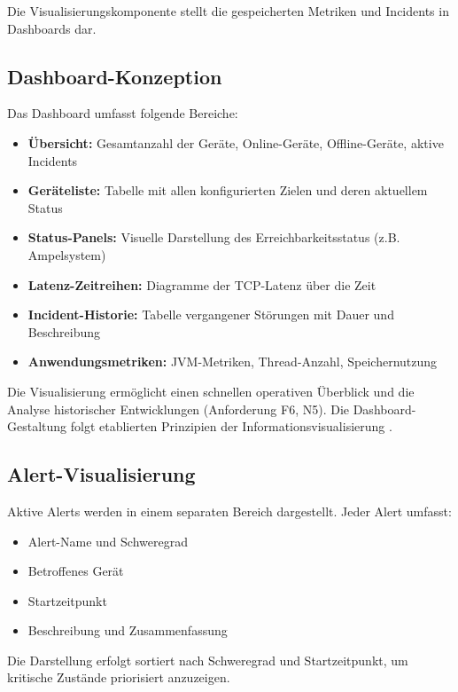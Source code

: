 Die Visualisierungskomponente stellt die gespeicherten Metriken und Incidents in Dashboards dar.

\subsection{Dashboard-Konzeption}
\label{subsec:dashboard-konzeption}

Das Dashboard umfasst folgende Bereiche:

\begin{itemize}
    \item \textbf{Übersicht:} Gesamtanzahl der Geräte, Online-Geräte, Offline-Geräte, aktive Incidents
    \item \textbf{Geräteliste:} Tabelle mit allen konfigurierten Zielen und deren aktuellem Status
    \item \textbf{Status-Panels:} Visuelle Darstellung des Erreichbarkeitsstatus (z.B. Ampelsystem)
    \item \textbf{Latenz-Zeitreihen:} Diagramme der TCP-Latenz über die Zeit
    \item \textbf{Incident-Historie:} Tabelle vergangener Störungen mit Dauer und Beschreibung
    \item \textbf{Anwendungsmetriken:} JVM-Metriken, Thread-Anzahl, Speichernutzung
\end{itemize}

Die Visualisierung ermöglicht einen schnellen operativen Überblick und die Analyse historischer Entwicklungen (Anforderung F6, N5). Die Dashboard-Gestaltung folgt etablierten Prinzipien der Informationsvisualisierung \cite{information-visualization-principles}.

\subsection{Alert-Visualisierung}
\label{subsec:alert-visualisierung}

Aktive Alerts werden in einem separaten Bereich dargestellt. Jeder Alert umfasst:

\begin{itemize}
    \item Alert-Name und Schweregrad
    \item Betroffenes Gerät
    \item Startzeitpunkt
    \item Beschreibung und Zusammenfassung
\end{itemize}

Die Darstellung erfolgt sortiert nach Schweregrad und Startzeitpunkt, um kritische Zustände priorisiert anzuzeigen.

